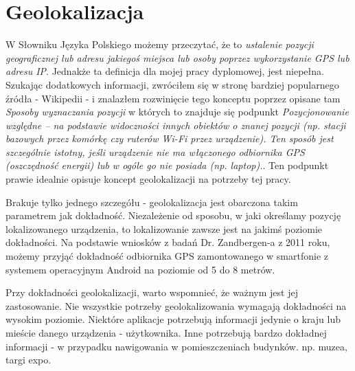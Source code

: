 


\section{Geolokalizacja}
W Słowniku Języka Polskiego możemy przeczytać, że to \textit{ustalenie pozycji geograficznej lub adresu jakiegoś miejsca lub osoby poprzez wykorzystanie GPS lub adresu IP}\cite{GeolokalizacjaSJP}. Jednakże ta definicja dla mojej pracy dyplomowej, jest niepełna. Szukając dodatkowych informacji, zwróciłem się w stronę bardziej popularnego źródła - Wikipedii - i znalazłem rozwinięcie tego konceptu poprzez opisane tam \textit{Sposoby wyznaczania pozycji} w których to znajduje się podpunkt \textit{Pozycjonowanie względne – na podstawie widoczności innych obiektów o znanej pozycji (np. stacji bazowych przez komórkę czy ruterów Wi-Fi przez urządzenie). Ten sposób jest szczególnie istotny, jeśli urządzenie nie ma włączonego odbiornika GPS (oszczędność energii) lub w ogóle go nie posiada (np. laptop).}\cite{GeolokalizacjaWiki}. Ten podpunkt prawie idealnie opisuje koncept geolokalizacji na potrzeby tej pracy. 

Brakuje tylko jednego szczegółu - geolokalizacja jest obarczona takim parametrem jak dokładność. Niezależenie od sposobu, w jaki określamy pozycję lokalizowanego urządzenia, to lokalizowanie zawsze jest na jakimś poziomie dokładności. Na podstawie wniosków z badań Dr. Zandbergen-a z 2011 roku, możemy przyjąć dokładność odbiornika GPS zamontowanego w smartfonie z systemem operacyjnym Android na poziomie od 5 do 8 metrów.\cite{GpsAccurancyZandbergen}

Przy dokładności geolokalizacji, warto wspomnieć, że ważnym jest jej zastosowanie. Nie wszystkie potrzeby geolokalizowania wymagają dokładności na wysokim poziomie. Niektóre aplikacje potrzebują informacji jedynie o kraju lub mieście danego urządzenia - użytkownika. Inne potrzebują bardzo dokładnej informacji - w przypadku nawigowania w pomieszczeniach budynków. np. muzea, targi expo. %

